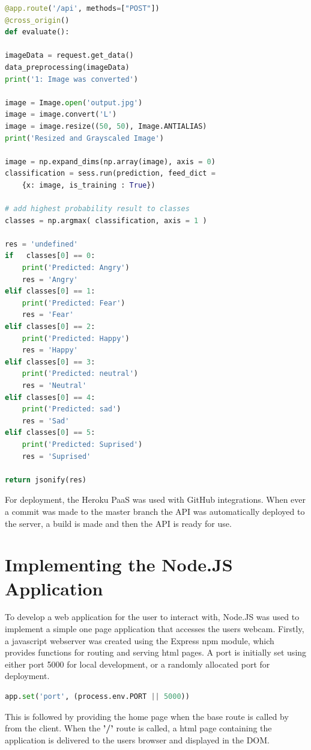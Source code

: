 \begin{lstlisting}[language=python, frame=single]
@app.route('/api', methods=["POST"])
@cross_origin()
def evaluate():

imageData = request.get_data()
data_preprocessing(imageData)
print('1: Image was converted')

image = Image.open('output.jpg')
image = image.convert('L')
image = image.resize((50, 50), Image.ANTIALIAS)
print('Resized and Grayscaled Image') 

image = np.expand_dims(np.array(image), axis = 0)
classification = sess.run(prediction, feed_dict = 
	{x: image, is_training : True})  
	
# add highest probability result to classes
classes = np.argmax( classification, axis = 1 )

res = 'undefined'
if   classes[0] == 0:
	print('Predicted: Angry')
	res = 'Angry'
elif classes[0] == 1:
	print('Predicted: Fear')
	res = 'Fear'
elif classes[0] == 2:
	print('Predicted: Happy')
	res = 'Happy'
elif classes[0] == 3:
	print('Predicted: neutral')
	res = 'Neutral'
elif classes[0] == 4:
	print('Predicted: sad')
	res = 'Sad'
elif classes[0] == 5:
	print('Predicted: Suprised')
	res = 'Suprised'

return jsonify(res)
\end{lstlisting}

For deployment, the Heroku PaaS was used with GitHub integrations. When ever a commit was made to the master branch the API was automatically deployed to the server, a build is made and then the API is ready for use.


\section{Implementing the Node.JS Application}
To develop a web application for the user to interact with, Node.JS was used to implement a simple one page application that accesses the users webcam. Firstly, a javascript webserver was created using the Express npm module, which provides functions for routing and serving html pages. A port is initially set using either port 5000 for local development, or a randomly allocated port for deployment. 

\begin{lstlisting}[language=python, frame=single]
	app.set('port', (process.env.PORT || 5000))
\end{lstlisting}

This is followed by providing the home page when the base route is called by from the client. When the \textbf{'/'} route is called, a html page containing the application is delivered to the users browser and displayed in the DOM.


